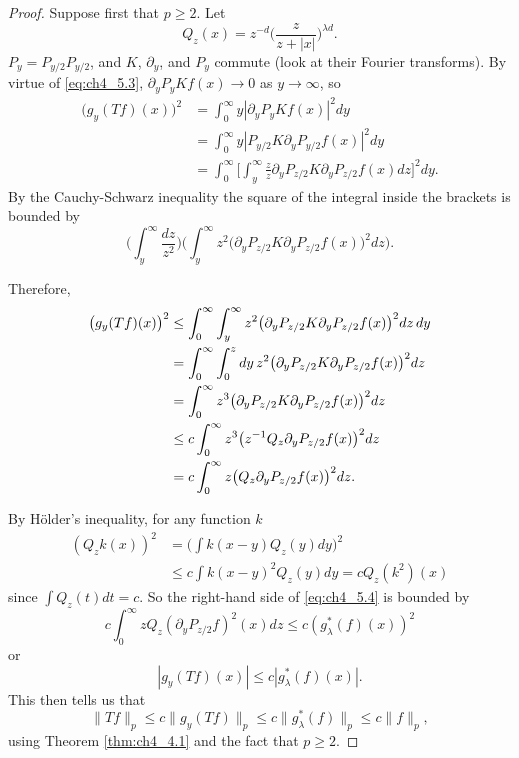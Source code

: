 \begin{proof}
Suppose first that $p \geq 2$. Let
\mpagebreak
\[
    Q_z(x) = z^{-d}\Big(\frac{z}{z+|x|}\Big)^{\lambda d}.
\]
$P_y = P_{y/2}P_{y/2}$, and $K$, $\partial_y$, and $P_y$ commute (look at their Fourier transforms). By virtue of \eqref{eq:ch4_5.3}, $\partial_yP_yKf(x) \to 0$ as $y \to \infty$, so
\begin{align*}
    \big(g_y(Tf)(x)\big)^2 &= \int_0^\infty y|\partial_yP_yKf(x)|^2 dy \\
    &= \int_0^\infty y|P_{y/2}K\partial_yP_{y/2}f(x)|^2 dy \\
    &= \int_0^\infty\Big[\int_y^\infty \frac{z}{z}\partial_yP_{z/2}K\partial_yP_{z/2}f(x)dz\Big]^2 dy.
\end{align*}
By the Cauchy-Schwarz inequality the square of the integral inside the brackets is bounded by
\[
    \Big(\int_y^\infty \frac{dz}{z^2}\Big)\Big(\int_y^\infty z^2\big(\partial_yP_{z/2}K\partial_yP_{z/2}f(x)\big)^2dz\Big).
\]

Therefore,
\begin{align}\label{eq:ch4_5.4}
    \big(g_y(Tf)(x)\big)^2 &\leq \int_0^\infty \int_y^\infty z^2\big(\partial_yP_{z/2}K\partial_yP_{z/2}f(x)\big)^2 dz\,dy \\
    &= \int_0^\infty \int_0^z dy\,z^2\big(\partial_yP_{z/2}K\partial_yP_{z/2}f(x)\big)^2dz \notag \\
    &= \int_0^\infty z^3\big(\partial_yP_{z/2}K\partial_yP_{z/2}f(x)\big)^2dz \notag \\
    &\leq c \int_0^\infty z^3\big(z^{-1}Q_z\partial_yP_{z/2}f(x)\big)^2dz \notag \\
    &= c \int_0^\infty z\big(Q_z\partial_yP_{z/2}f(x)\big)^2dz. \notag
\end{align}

By H\"older's inequality, for any function $k$
\begin{align*}
    (Q_zk(x))^2 &= \Big(\int k(x-y)Q_z(y)dy\Big)^2 \\
    &\leq c \int k(x-y)^2Q_z(y)dy = cQ_z(k^2)(x)
\end{align*}
since $\int Q_z(t)dt = c$. So the right-hand side of \eqref{eq:ch4_5.4} is bounded by
\[
    c \int_0^\infty zQ_z(\partial_yP_{z/2}f)^2(x)dz \leq c(g_\lambda^*(f)(x))^2
\]
or
\[
    |g_y(Tf)(x)| \leq c|g_\lambda^*(f)(x)|.
\]
This then tells us that
\mpagebreak
\[
    \|Tf\|_p \leq c\|g_y(Tf)\|_p \leq c\|g_\lambda^*(f)\|_p \leq c\|f\|_p,
\]
using Theorem \ref{thm:ch4_4.1} and the fact that $p \geq 2$.


\end{proof}
